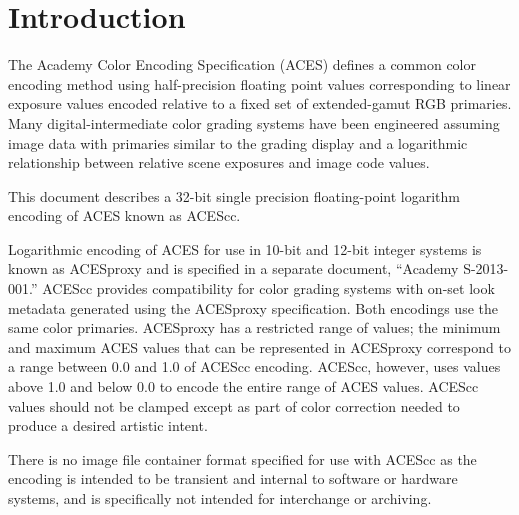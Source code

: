 \unnumberedformat	    %
\chapter{Introduction} 	%

The Academy Color Encoding Specification (ACES) defines a common color encoding method using half-precision floating point values corresponding to linear exposure values encoded relative to a fixed set of extended-gamut RGB primaries. Many digital-intermediate color grading systems have been engineered assuming image data with primaries similar to the grading display and a logarithmic relationship between relative scene exposures and image code values.

This document describes a 32-bit single precision floating-point logarithm encoding of ACES known as ACEScc.

Logarithmic encoding of ACES for use in 10-bit and 12-bit integer systems is known as ACESproxy and is specified in a separate document, ``Academy S-2013-001.'' ACEScc provides compatibility for color grading systems with on-set look metadata generated using the ACESproxy specification. Both encodings use the same color primaries. ACESproxy has a restricted range of values; the minimum and maximum ACES values that can be represented in ACESproxy correspond to a range between 0.0 and 1.0 of ACEScc encoding. ACEScc, however, uses values above 1.0 and below 0.0 to encode the entire range of ACES values. ACEScc values should not be clamped except as part of color correction needed to produce a desired artistic intent.

There is no image file container format specified for use with ACEScc as the encoding is intended to be transient and internal to software or hardware systems, and is specifically not intended for interchange or archiving.
